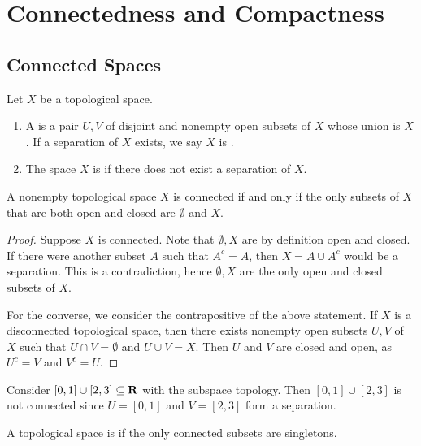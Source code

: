 \chapter{Connectedness and Compactness}

\section{Connected Spaces}

\begin{definition}
    Let $X$ be a topological space.
    \begin{enumerate}[label = (\arabic*),itemsep=1pt,topsep=3pt]
        \item A  is a pair $U,V$ of disjoint and nonempty open subsets of $X$ whose union is $X$. If a separation of $X$ exists, we say $X$ is .
        \item The space $X$ is  if there does not exist a separation of $X$. 
    \end{enumerate}
\end{definition}

\begin{proposition}
    A nonempty topological space $X$ is connected if and only if the only subsets of $X$ that are both open and closed are $\emptyset$ and $X$.
\end{proposition}
    \begin{proof}
        Suppose $X$ is connected. Note that $\emptyset,X$ are by definition open and closed. If there were another subset $A$ such that $A^c = A$, then $X = A \cup A^c$ would be a separation. This is a contradiction, hence $\emptyset,X$ are the only open and closed subsets of $X$.

        For the converse, we consider the contrapositive of the above statement. If $X$ is a disconnected topological space, then there exists nonempty open subsets $U,V$ of $X$ such that $U \cap V = \emptyset$ and $U \cup V = X$. Then $U$ and $V$ are closed and open, as $U^c = V$ and $V^c = U$.
    \end{proof}

\begin{example}
    Consider $[0,1] \cup [2,3] \subseteq \mathbf{R}$ with the subspace topology. Then $[0,1] \cup [2,3]$ is not connected since $U = [0,1]$ and $V = [2,3]$ form a separation.
\end{example}

\begin{definition}
    A topological space is  if the only connected subsets are singletons.
\end{definition}

